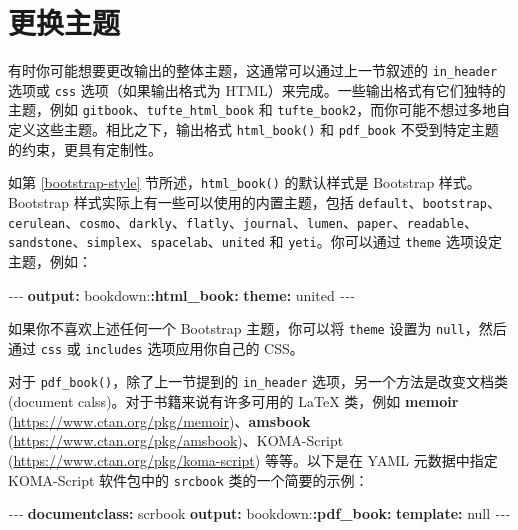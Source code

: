 \documentclass[
  12pt,
]{krantz}
\newenvironment{Shaded}{\begin{snugshade}}{\end{snugshade}}
\newcommand{\AttributeTok}[1]{\textcolor[rgb]{0.13,0.29,0.53}{#1}}
\newcommand{\CharTok}[1]{\textcolor[rgb]{0.31,0.60,0.02}{#1}}
\newcommand{\FunctionTok}[1]{\textcolor[rgb]{0.13,0.29,0.53}{\textbf{#1}}}
\newcommand{\KeywordTok}[1]{\textcolor[rgb]{0.13,0.29,0.53}{\textbf{#1}}}
\newcommand{\PreprocessorTok}[1]{\textcolor[rgb]{0.56,0.35,0.01}{\textit{#1}}}
\theoremstyle{definition}
\theoremstyle{definition}
\theoremstyle{definition}
\theoremstyle{definition}
\theoremstyle{remark}
\begin{document}
\section{更换主题}\label{ux66f4ux6362ux4e3bux9898}

有时你可能想要更改输出的整体主题，这通常可以通过上一节叙述的 \texttt{in\_header} 选项或 \texttt{css} 选项（如果输出格式为 HTML）来完成。一些输出格式有它们独特的主题，例如 \texttt{gitbook}、\texttt{tufte\_html\_book} 和 \texttt{tufte\_book2}，而你可能不想过多地自定义这些主题。相比之下，输出格式 \texttt{html\_book()} 和 \texttt{pdf\_book} 不受到特定主题的约束，更具有定制性。

如第 \ref{bootstrap-style} 节所述，\texttt{html\_book()} 的默认样式是 Bootstrap 样式。Bootstrap 样式实际上有一些可以使用的内置主题，包括 \texttt{default}、\texttt{bootstrap}、\texttt{cerulean}、\texttt{cosmo}、\texttt{darkly}、\texttt{flatly}、\texttt{journal}、\texttt{lumen}、\texttt{paper}、\texttt{readable}、\texttt{sandstone}、\texttt{simplex}、\texttt{spacelab}、\texttt{united} 和 \texttt{yeti}。你可以通过 \texttt{theme} 选项设定主题，例如：

\begin{Shaded}
\begin{Highlighting}[]
\PreprocessorTok{{-}{-}{-}}
\FunctionTok{output}\KeywordTok{:}
\AttributeTok{  bookdown:}\FunctionTok{:html\_book}\KeywordTok{:}
\AttributeTok{    }\FunctionTok{theme}\KeywordTok{:}\AttributeTok{ united}
\PreprocessorTok{{-}{-}{-}}
\end{Highlighting}
\end{Shaded}

如果你不喜欢上述任何一个 Bootstrap 主题，你可以将 \texttt{theme} 设置为 \texttt{null}，然后通过 \texttt{css} 或 \texttt{includes} 选项应用你自己的 CSS。

对于 \texttt{pdf\_book()}，除了上一节提到的 \texttt{in\_header} 选项，另一个方法是改变文档类 (document calss)。对于书籍来说有许多可用的 LaTeX 类，例如 \textbf{memoir} (\url{https://www.ctan.org/pkg/memoir})、\textbf{amsbook} (\url{https://www.ctan.org/pkg/amsbook})、KOMA-Script (\url{https://www.ctan.org/pkg/koma-script}) 等等。以下是在 YAML 元数据中指定 KOMA-Script 软件包中的 \texttt{srcbook} 类的一个简要的示例：

\begin{Shaded}
\begin{Highlighting}[]
\PreprocessorTok{{-}{-}{-}}
\FunctionTok{documentclass}\KeywordTok{:}\AttributeTok{ scrbook}
\FunctionTok{output}\KeywordTok{:}
\AttributeTok{  bookdown:}\FunctionTok{:pdf\_book}\KeywordTok{:}
\AttributeTok{    }\FunctionTok{template}\KeywordTok{:}\AttributeTok{ }\CharTok{null}
\PreprocessorTok{{-}{-}{-}}
\end{Highlighting}
\end{Shaded}
\end{document}
